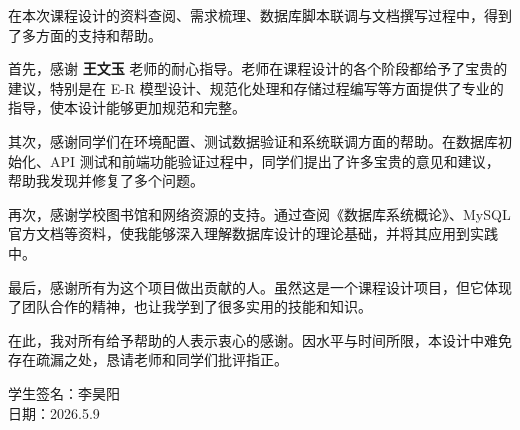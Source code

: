 
在本次课程设计的资料查阅、需求梳理、数据库脚本联调与文档撰写过程中，得到了多方面的支持和帮助。

首先，感谢 \textbf{王文玉} 老师的耐心指导。老师在课程设计的各个阶段都给予了宝贵的建议，特别是在 E-R 模型设计、规范化处理和存储过程编写等方面提供了专业的指导，使本设计能够更加规范和完整。

其次，感谢同学们在环境配置、测试数据验证和系统联调方面的帮助。在数据库初始化、API 测试和前端功能验证过程中，同学们提出了许多宝贵的意见和建议，帮助我发现并修复了多个问题。

再次，感谢学校图书馆和网络资源的支持。通过查阅《数据库系统概论》、MySQL 官方文档等资料，使我能够深入理解数据库设计的理论基础，并将其应用到实践中。

最后，感谢所有为这个项目做出贡献的人。虽然这是一个课程设计项目，但它体现了团队合作的精神，也让我学到了很多实用的技能和知识。

在此，我对所有给予帮助的人表示衷心的感谢。因水平与时间所限，本设计中难免存在疏漏之处，恳请老师和同学们批评指正。

\vspace{2cm}

\begin{flushright}
  学生签名：李昊阳  \\
  日期：2026.5.9 
\end{flushright}

